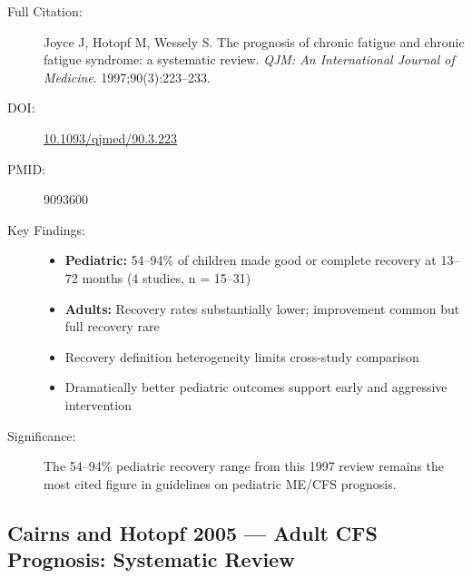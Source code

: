 \begin{description}
    \item[Full Citation:] Joyce J, Hotopf M, Wessely S\@. The prognosis of chronic fatigue and chronic fatigue syndrome: a systematic review. \textit{QJM: An International Journal of Medicine}. 1997;90(3):223--233.
    \item[DOI:] \href{https://doi.org/10.1093/qjmed/90.3.223}{10.1093/qjmed/90.3.223}
    \item[PMID:] 9093600
    \item[Key Findings:]
    \begin{itemize}
        \item \textbf{Pediatric:} 54--94\% of children made good or complete recovery at 13--72 months (4 studies, n = 15--31)
        \item \textbf{Adults:} Recovery rates substantially lower; improvement common but full recovery rare
        \item Recovery definition heterogeneity limits cross-study comparison
        \item Dramatically better pediatric outcomes support early and aggressive intervention
    \end{itemize}
    \item[Significance:] The 54--94\% pediatric recovery range from this 1997 review remains the most cited figure in guidelines on pediatric ME/CFS prognosis.
\end{description}

\subsection{Cairns and Hotopf 2005 --- Adult CFS Prognosis: Systematic Review}


